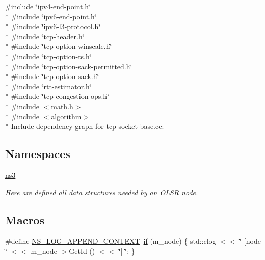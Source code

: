 {\ttfamily \#include \char`\"{}ipv4-\/end-\/point.\+h\char`\"{}}\\*
{\ttfamily \#include \char`\"{}ipv6-\/end-\/point.\+h\char`\"{}}\\*
{\ttfamily \#include \char`\"{}ipv6-\/l3-\/protocol.\+h\char`\"{}}\\*
{\ttfamily \#include \char`\"{}tcp-\/header.\+h\char`\"{}}\\*
{\ttfamily \#include \char`\"{}tcp-\/option-\/winscale.\+h\char`\"{}}\\*
{\ttfamily \#include \char`\"{}tcp-\/option-\/ts.\+h\char`\"{}}\\*
{\ttfamily \#include \char`\"{}tcp-\/option-\/sack-\/permitted.\+h\char`\"{}}\\*
{\ttfamily \#include \char`\"{}tcp-\/option-\/sack.\+h\char`\"{}}\\*
{\ttfamily \#include \char`\"{}rtt-\/estimator.\+h\char`\"{}}\\*
{\ttfamily \#include \char`\"{}tcp-\/congestion-\/ops.\+h\char`\"{}}\\*
{\ttfamily \#include $<$math.\+h$>$}\\*
{\ttfamily \#include $<$algorithm$>$}\\*
Include dependency graph for tcp-\/socket-\/base.cc\+:
\subsection*{Namespaces}
\begin{DoxyCompactItemize}
\item 
 \hyperlink{namespacens3}{ns3}
\begin{DoxyCompactList}\small\item\em Here are defined all data structures needed by an O\+L\+SR node. \end{DoxyCompactList}\end{DoxyCompactItemize}
\subsection*{Macros}
\begin{DoxyCompactItemize}
\item 
\#define \hyperlink{tcp-socket-base_8cc_abe50035652d407c40bdaef78214c4955}{N\+S\+\_\+\+L\+O\+G\+\_\+\+A\+P\+P\+E\+N\+D\+\_\+\+C\+O\+N\+T\+E\+XT}~\hyperlink{loss__OH__large__cities__urban_8m_ac77b6cfa3068152087725fe54b4ae8c8}{if} (m\+\_\+node) \{ std\+::clog $<$$<$ \char`\"{} \mbox{[}node \char`\"{} $<$$<$ m\+\_\+node-\/$>$Get\+Id () $<$$<$ \char`\"{}\mbox{]} \char`\"{}; \}
\end{DoxyCompactItemize}
